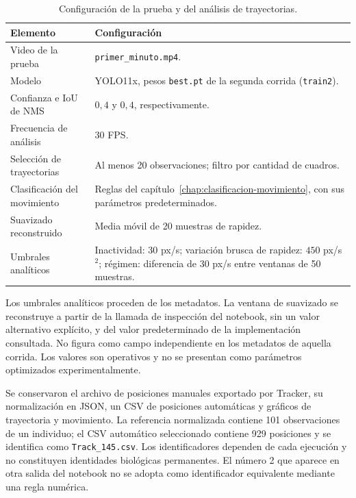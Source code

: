 \begin{table}[htbp]
 \centering
 \caption{Configuración de la prueba y del análisis de trayectorias.}
 \label{tab:configuracion-experimental}
 \small
 \begin{tabularx}{\textwidth}{@{}p{}X@{}}
  \toprule
  Elemento & Configuración \\
  \midrule
  Video de la prueba & \texttt{primer\_minuto.mp4}. \\
  Modelo & YOLO11x, pesos \texttt{best.pt} de la segunda corrida (\texttt{train2}). \\
  Confianza e IoU de NMS & $0{,}4$ y $0{,}4$, respectivamente. \\
  Frecuencia de análisis & 30 FPS. \\
  Selección de trayectorias & Al menos 20 observaciones; filtro por cantidad de cuadros. \\
  Clasificación del movimiento & Reglas del capítulo~\ref{chap:clasificacion-movimiento}, con sus parámetros predeterminados. \\
  Suavizado reconstruido & Media móvil de 20 muestras de rapidez. \\
  Umbrales analíticos & Inactividad: 30 px/s; variación brusca de rapidez: $450$ px/s$^2$; régimen: diferencia de 30 px/s entre ventanas de 50 muestras. \\
  \bottomrule
 \end{tabularx}
\end{table}

Los umbrales analíticos proceden de los metadatos. La ventana de suavizado se reconstruye a partir de la llamada de inspección del notebook, sin un valor alternativo explícito, y del valor predeterminado de la implementación consultada. No figura como campo independiente en los metadatos de aquella corrida. Los valores son operativos y no se presentan como parámetros optimizados experimentalmente.

Se conservaron el archivo de posiciones manuales exportado por Tracker, su normalización en JSON, un CSV de posiciones automáticas y gráficos de trayectoria y movimiento. La referencia normalizada contiene 101 observaciones de un individuo; el CSV automático seleccionado contiene 929 posiciones y se identifica como \texttt{Track\_145.csv}. Los identificadores dependen de cada ejecución y no constituyen identidades biológicas permanentes. El número 2 que aparece en otra salida del notebook no se adopta como identificador equivalente mediante una regla numérica.

